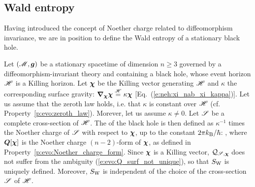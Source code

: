 \subsection{Wald entropy}

Having introduced the concept of Noether charge related to diffeomorphism invariance,
we are in position to define the Wald entropy of a stationary black hole.

\begin{prop}
Let $(\mathscr{M},\bm{g})$ be a stationary spacetime of dimension $n\geq 3$ governed
by a diffeomorphism-invariant theory and containing a black hole, whose
event horizon $\mathscr{H}$ is a Killing horizon. Let $\bm{\chi}$ be the Killing
vector generating $\mathscr{H}$ and $\kappa$ the corresponding surface gravity:
$\bm{\nabla}_{\bm{\chi}}\bm{\chi} \stackrel{\mathscr{H}}{=} \kappa \bm{\chi}$ [Eq.~(\ref{e:neh:xi_nab_xi_kappa})].
Let us assume that the zeroth law holds, i.e. that $\kappa$ is constant over $\mathscr{H}$
(cf. Property~\ref{p:evo:zeroth_law}). Morever,  let us assume $\kappa \neq 0$.
Let $\mathscr{S}$ be a complete cross-section of $\mathscr{H}$.
The  of the black hole is
then defined as $\kappa^{-1}$ times
the Noether charge of $\mathscr{S}$ with respect to $\bm{\chi}$,
up to the constant $2\pi k_{\rm B}/\hbar$:
\be \label{e:evo:def_Wald_entropy}
     ,
\ee
where $\bm{Q}[\bm{\chi}]$ is the Noether charge $(n-2)$-form of $\bm{\chi}$,
as defined in Property~\ref{p:evo:Noether_charge_form}.
Since $\bm{\chi}$ is a Killing vector, $\mathcal{Q}_{\mathscr{S},\bm{\chi}}$ does not suffer from
the ambiguity (\ref{e:evo:Q_surf_not_unique}), so that $S_{\rm W}$ is uniquely defined.
Moreover, $S_{\rm W}$ is independent of the choice of the cross-section $\mathscr{S}$ of $\mathscr{H}$.
\end{prop}

